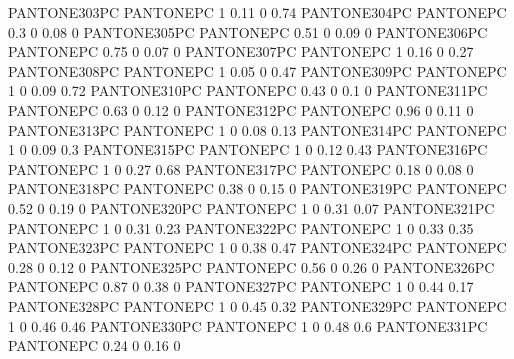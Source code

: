  {PANTONE303PC} {PANTONE\SpotSpace PC} {1 0.11 0 0.74}
 {PANTONE304PC} {PANTONE\SpotSpace PC} {0.3 0 0.08 0}
 {PANTONE305PC} {PANTONE\SpotSpace PC} {0.51 0 0.09 0}
 {PANTONE306PC} {PANTONE\SpotSpace PC} {0.75 0 0.07 0}
 {PANTONE307PC} {PANTONE\SpotSpace PC} {1 0.16 0 0.27}
 {PANTONE308PC} {PANTONE\SpotSpace PC} {1 0.05 0 0.47}
 {PANTONE309PC} {PANTONE\SpotSpace PC} {1 0 0.09 0.72}
 {PANTONE310PC} {PANTONE\SpotSpace PC} {0.43 0 0.1 0}
 {PANTONE311PC} {PANTONE\SpotSpace PC} {0.63 0 0.12 0}
 {PANTONE312PC} {PANTONE\SpotSpace PC} {0.96 0 0.11 0}
 {PANTONE313PC} {PANTONE\SpotSpace PC} {1 0 0.08 0.13}
 {PANTONE314PC} {PANTONE\SpotSpace PC} {1 0 0.09 0.3}
 {PANTONE315PC} {PANTONE\SpotSpace PC} {1 0 0.12 0.43}
 {PANTONE316PC} {PANTONE\SpotSpace PC} {1 0 0.27 0.68}
 {PANTONE317PC} {PANTONE\SpotSpace PC} {0.18 0 0.08 0}
 {PANTONE318PC} {PANTONE\SpotSpace PC} {0.38 0 0.15 0}
 {PANTONE319PC} {PANTONE\SpotSpace PC} {0.52 0 0.19 0}
 {PANTONE320PC} {PANTONE\SpotSpace PC} {1 0 0.31 0.07}
 {PANTONE321PC} {PANTONE\SpotSpace PC} {1 0 0.31 0.23}
 {PANTONE322PC} {PANTONE\SpotSpace PC} {1 0 0.33 0.35}
 {PANTONE323PC} {PANTONE\SpotSpace PC} {1 0 0.38 0.47}
 {PANTONE324PC} {PANTONE\SpotSpace PC} {0.28 0 0.12 0}
 {PANTONE325PC} {PANTONE\SpotSpace PC} {0.56 0 0.26 0}
 {PANTONE326PC} {PANTONE\SpotSpace PC} {0.87 0 0.38 0}
 {PANTONE327PC} {PANTONE\SpotSpace PC} {1 0 0.44 0.17}
 {PANTONE328PC} {PANTONE\SpotSpace PC} {1 0 0.45 0.32}
 {PANTONE329PC} {PANTONE\SpotSpace PC} {1 0 0.46 0.46}
 {PANTONE330PC} {PANTONE\SpotSpace PC} {1 0 0.48 0.6}
 {PANTONE331PC} {PANTONE\SpotSpace PC} {0.24 0 0.16 0}

